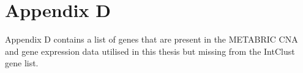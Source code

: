 \section*{Appendix D}
\renewcommand{\thefigure}{D\arabic{figure}}
\renewcommand{\thetable}{D\arabic{table}}
\setcounter{figure}{0}
\setcounter{table}{0}

{}


Appendix D contains a list of genes that are present in the METABRIC CNA and gene expression data utilised in this thesis but missing from the IntClust gene list. 


